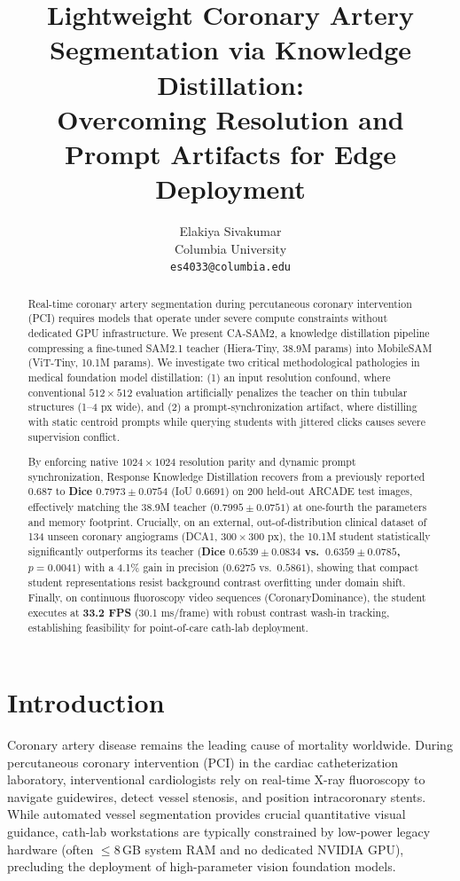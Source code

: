 \documentclass[10pt,twocolumn]{article}
\title{\textbf{Lightweight Coronary Artery Segmentation via Knowledge Distillation:\\
Overcoming Resolution and Prompt Artifacts for Edge Deployment}}
\author{
  Elakiya Sivakumar\\
  Columbia University\\
  \texttt{es4033@columbia.edu}
}
\date{}
\begin{document}
\maketitle

\begin{abstract}
Real-time coronary artery segmentation during percutaneous coronary intervention (PCI) requires models that operate under severe compute constraints without dedicated GPU infrastructure. We present CA-SAM2, a knowledge distillation pipeline compressing a fine-tuned SAM2.1 teacher (Hiera-Tiny, 38.9M params) into MobileSAM (ViT-Tiny, 10.1M params). We investigate two critical methodological pathologies in medical foundation model distillation: (1) an input resolution confound, where conventional $512\times 512$ evaluation artificially penalizes the teacher on thin tubular structures (1--4 px wide), and (2) a prompt-synchronization artifact, where distilling with static centroid prompts while querying students with jittered clicks causes severe supervision conflict. 

By enforcing native $1024\times 1024$ resolution parity and dynamic prompt synchronization, Response Knowledge Distillation recovers from a previously reported $0.687$ to \textbf{Dice $0.7973 \pm 0.0754$} (IoU $0.6691$) on 200 held-out ARCADE test images, effectively matching the 38.9M teacher ($0.7995 \pm 0.0751$) at one-fourth the parameters and memory footprint. Crucially, on an external, out-of-distribution clinical dataset of 134 unseen coronary angiograms (DCA1, $300\times 300$ px), the 10.1M student statistically significantly outperforms its teacher (\textbf{Dice $0.6539 \pm 0.0834$ vs.\ $0.6359 \pm 0.0785$, $p = 0.0041$}) with a 4.1\% gain in precision ($0.6275$ vs.\ $0.5861$), showing that compact student representations resist background contrast overfitting under domain shift. Finally, on continuous fluoroscopy video sequences (CoronaryDominance), the student executes at \textbf{33.2 FPS} (30.1 ms/frame) with robust contrast wash-in tracking, establishing feasibility for point-of-care cath-lab deployment.
\end{abstract}

\section{Introduction}

Coronary artery disease remains the leading cause of mortality worldwide. During percutaneous coronary intervention (PCI) in the cardiac catheterization laboratory, interventional cardiologists rely on real-time X-ray fluoroscopy to navigate guidewires, detect vessel stenosis, and position intracoronary stents. While automated vessel segmentation provides crucial quantitative visual guidance, cath-lab workstations are typically constrained by low-power legacy hardware (often $\le 8$\,GB system RAM and no dedicated NVIDIA GPU), precluding the deployment of high-parameter vision foundation models.
\end{document}
